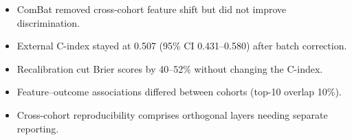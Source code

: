 \documentclass[a4paper]{article}
\begin{document}
\begin{itemize}
\item ComBat removed cross-cohort feature shift but did not improve discrimination.
\item External C-index stayed at 0.507 (95\% CI 0.431--0.580) after batch correction.
\item Recalibration cut Brier scores by 40--52\% without changing the C-index.
\item Feature--outcome associations differed between cohorts (top-10 overlap 10\%).
\item Cross-cohort reproducibility comprises orthogonal layers needing separate reporting.
\end{itemize}
\end{document}
